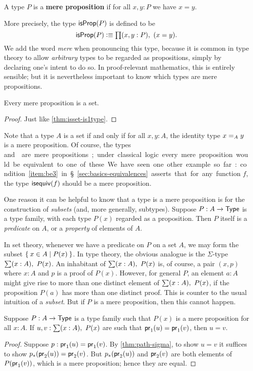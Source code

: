 \begin{defn}
  A type $P$ is a \textbf{mere proposition} if for all $x,y:P$ we have $x=y$.
\end{defn}

More precisely, the type $\isprop(P)$ is defined to be
\[ \isprop(P) \defeq \prd{x,y:P} (x=y). \]
We add the word \emph{mere} when pronouncing this type, because it is common in type theory to allow \emph{arbitrary} types to be regarded as propositions, simply by declaring one's intent to do so.
In proof-relevant mathematics, this is entirely sensible; but it is nevertheless important to know which types are mere propositions.

\begin{thm}\label{thm:isset-prop}
  Every mere proposition is a set.
\end{thm}
\begin{proof}
  Just like \autoref{thm:isset-is1type}.
\end{proof}

Note that a type $A$ is a set if and only if for all $x,y:A$, the identity type $\id[A]xy$ is a mere proposition.
Of course, the types \unit and \emptyt are mere propositions; under classical logic every mere proposition would be equivalent to one of these.
We have seen one other example so far: condition~\ref{item:be3} in \S\ref{sec:basics-equivalences} asserts that for any function $f$, the type $\isequiv (f)$ should be a mere proposition.

One reason it can be helpful to know that a type is a mere proposition is for the construction of \emph{subsets} (and, more generally, subtypes).
Suppose $P:A\to\type$ is a type family, with each type $P(x)$ regarded as a proposition.
Then $P$ itself is a \emph{predicate} on $A$, or a \emph{property} of elements of $A$.

In set theory, whenever we have a predicate on $P$ on a set $A$, we may form the subset $\setof{x\in A | P(x)}$.
In type theory, the obvious analogue is the $\Sigma$-type $\sm{x:A} P(x)$.
An inhabitant of $\sm{x:A} P(x)$ is, of course, a pair $(x,p)$ where $x:A$ and $p$ is a proof of $P(x)$.
However, for general $P$, an element $a:A$ might give rise to more than one distinct element of $\sm{x:A} P(x)$, if the proposition $P(a)$ has more than one distinct proof.
This is counter to the usual intuition of a \emph{subset}.
But if $P$ is a mere proposition, then this cannot happen.

\begin{lem}
  Suppose $P:A\to\type$ is a type family such that $P(x)$ is a mere proposition for all $x:A$.
  If $u,v:\sm{x:A} P(x)$ are such that $\proj1(u) = \proj1(v)$, then $u=v$.
\end{lem}
\begin{proof}
  Suppose $p:\proj1(u) = \proj1(v)$.
  By \autoref{thm:path-sigma}, to show $u=v$ it suffices to show $\trans{p}{\proj2(u)} = \proj2(v)$.
  But $\trans{p}{\proj2(u)}$ and $\proj2(v)$ are both elements of $P(\proj1(v))$, which is a mere proposition; hence they are equal.
\end{proof}

